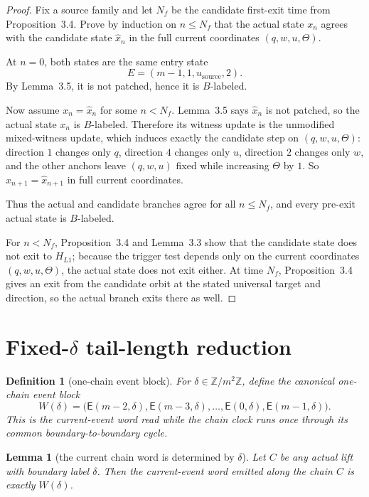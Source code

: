 \documentclass[11pt]{article}
\newtheorem{definition}[theorem]{Definition}
\newtheorem{lemma}[theorem]{Lemma}
\newcommand{\Z}{\mathbb Z}
\newcommand{\Ev}{\mathsf E}
\begin{document}
\begin{proof}
Fix a source family and let $N_f$ be the candidate first-exit time from
Proposition~3.4. Prove by induction on $n\le N_f$ that the actual state $x_n$
agrees with the candidate state $\widehat x_n$ in the full current coordinates
$(q,w,u,\Theta)$.

At $n=0$, both states are the same entry state
\[
E=(m-1,1,u_{\mathrm{source}},2).
\]
By Lemma~3.5, it is not patched, hence it is $B$-labeled.

Now assume $x_n=\widehat x_n$ for some $n<N_f$. Lemma~3.5 says $\widehat x_n$
is not patched, so the actual state $x_n$ is $B$-labeled. Therefore its
witness update is the unmodified mixed-witness update, which induces exactly
the candidate step on $(q,w,u,\Theta)$: direction $1$ changes only $q$,
direction $4$ changes only $u$, direction $2$ changes only $w$, and the other
anchors leave $(q,w,u)$ fixed while increasing $\Theta$ by $1$. So
$x_{n+1}=\widehat x_{n+1}$ in full current coordinates.

Thus the actual and candidate branches agree for all $n\le N_f$, and every
pre-exit actual state is $B$-labeled.

For $n<N_f$, Proposition~3.4 and Lemma~3.3 show that the candidate state does
not exit to $H_{L1}$; because the trigger test depends only on the current
coordinates $(q,w,u,\Theta)$, the actual state does not exit either. At time
$N_f$, Proposition~3.4 gives an exit from the candidate orbit at the stated
universal target and direction, so the actual branch exits there as well.
\end{proof}

\section{Fixed-$\delta$ tail-length reduction}

\begin{definition}[one-chain event block]
For $\delta\in\Z/m^2\Z$, define the canonical one-chain event block
\[
W(\delta)=\bigl(\Ev(m-2,\delta),\Ev(m-3,\delta),\dots,\Ev(0,\delta),\Ev(m-1,\delta)\bigr).
\]
This is the current-event word read while the chain clock runs once through its
common boundary-to-boundary cycle.
\end{definition}

\begin{lemma}[the current chain word is determined by $\delta$]
Let $C$ be any actual lift with boundary label $\delta$. Then the current-event
word emitted along the chain $C$ is exactly $W(\delta)$.
\end{lemma}
\end{document}
